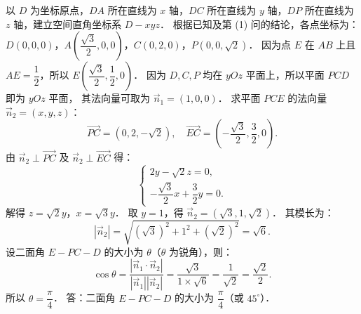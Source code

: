 \begin{answer}
以 $D$ 为坐标原点，$DA$ 所在直线为 $x$ 轴，$DC$ 所在直线为 $y$ 轴，$DP$ 所在直线为 $z$ 轴，建立空间直角坐标系 $D - xyz$．
根据已知及第 (1) 问的结论，各点坐标为：
$D(0, 0, 0)$，$A\left(\dfrac{\sqrt{3}}{2}, 0, 0\right)$，$C(0, 2, 0)$，$P(0, 0, \sqrt{2})$．
因为点 $E$ 在 $AB$ 上且 $AE = \dfrac{1}{2}$，所以 $E\left(\dfrac{\sqrt{3}}{2}, \dfrac{1}{2}, 0\right)$．
因为 $D, C, P$ 均在 $yOz$ 平面上，所以平面 $PCD$ 即为 $yOz$ 平面，
其法向量可取为 $\vec{n}_1 = (1, 0, 0)$．
求平面 $PCE$ 的法向量 $\vec{n}_2 = (x, y, z)$：
\nopagebreak[4]
\[
\vec{PC} = (0, 2, -\sqrt{2}), \quad \vec{EC} = \left(-\frac{\sqrt{3}}{2}, \frac{3}{2}, 0\right).
\]
由 $\vec{n}_2 \perp \vec{PC}$ 及 $\vec{n}_2 \perp \vec{EC}$ 得：
\nopagebreak[4]
\[
\begin{cases}
2y - \sqrt{2}z = 0, \\
-\dfrac{\sqrt{3}}{2}x + \dfrac{3}{2}y = 0.
\end{cases}
\]
解得 $z = \sqrt{2}y$，$x = \sqrt{3}y$．
取 $y = 1$，得 $\vec{n}_2 = (\sqrt{3}, 1, \sqrt{2})$．
其模长为：
\nopagebreak[4]
\[
|\vec{n}_2| = \sqrt{(\sqrt{3})^2 + 1^2 + (\sqrt{2})^2} = \sqrt{6}.
\]
设二面角 $E - PC - D$ 的大小为 $\theta$（$\theta$ 为锐角），则：
\nopagebreak[4]
\[
\cos\theta = \frac{|\vec{n}_1 \cdot \vec{n}_2|}{|\vec{n}_1||\vec{n}_2|} = \frac{\sqrt{3}}{1 \times \sqrt{6}} = \frac{1}{\sqrt{2}} = \frac{\sqrt{2}}{2}.
\]
所以 $\theta = \dfrac{\pi}{4}$．
答：二面角 $E - PC - D$ 的大小为 $\dfrac{\pi}{4}$（或 $45^\circ$）．



\end{answer}
